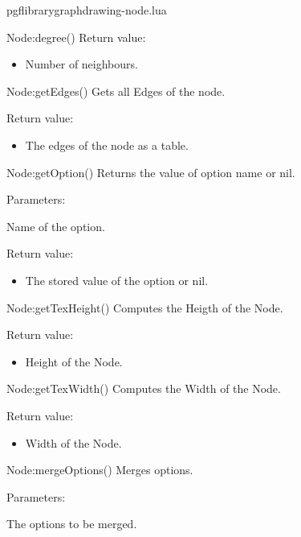 \begin{filedescription}{pgflibrarygraphdrawing-node.lua}
\begin{luacommand}{{Node:degree}()}
Return value:
\begin{itemize} \item[] Number of neighbours. \end{itemize}


\end{luacommand}\begin{luacommand}{{Node:getEdges}()}
Gets all Edges of the node.


Return value:
\begin{itemize} \item[] The edges of the node as a table. \end{itemize}


\end{luacommand}\begin{luacommand}{{Node:getOption}()}
Returns the value of option name or nil.

Parameters:
\begin{parameterdescription}
	\item[\meta{name}] Name of the option.
\end{parameterdescription}


Return value:
\begin{itemize} \item[] The stored value of the option or nil. \end{itemize}


\end{luacommand}\begin{luacommand}{{Node:getTexHeight}()}
Computes the Heigth of the Node.


Return value:
\begin{itemize} \item[] Height of the Node. \end{itemize}


\end{luacommand}\begin{luacommand}{{Node:getTexWidth}()}
Computes the Width of the Node.


Return value:
\begin{itemize} \item[] Width of the Node. \end{itemize}


\end{luacommand}\begin{luacommand}{{Node:mergeOptions}()}
Merges options.

Parameters:
\begin{parameterdescription}
	\item[\meta{options}] The options to be merged.
\end{parameterdescription}




\end{luacommand}
\end{filedescription}
